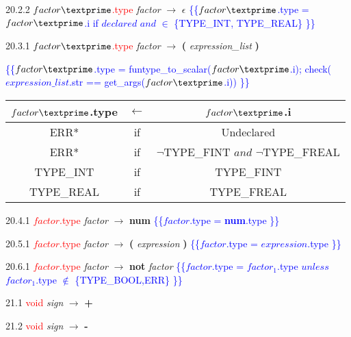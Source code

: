 20.2.2 \textcolor{red}{$factor\textprime$.type} \emph{factor\textprime} $\rightarrow$ $\epsilon$ \textcolor{blue}{\{\{$factor\textprime$.type = $factor\textprime$.i if $declared$ $and$ $\in$ \{TYPE_INT, TYPE_REAL\} \}\}}

20.3.1 \textcolor{red}{$factor\textprime$.type} \emph{factor\textprime} $\rightarrow$ \textbf{(} \emph{expression\_list} \textbf{)}

\textcolor{blue}{\{\{$factor\textprime$.type = funtype_to_scalar($factor\textprime$.i); check($expression\_list$.str == get_args($factor\textprime$.i)) \}\}}

\begin{tabular}[t]{|c|c|c|}
  \hline

  $factor\textprime$.type & \textbf{$\leftarrow$} & $factor\textprime$.i \\

  \hline
  ERR* & if & Undeclared \\
  ERR* & if & $\neg$TYPE_FINT $and$ $\neg$TYPE_FREAL \\
  TYPE_INT & if & TYPE_FINT \\
  TYPE_REAL & if & TYPE_FREAL \\

  \hline

\end{tabular}

20.4.1 \textcolor{red}{$factor$.type} \emph{factor} $\rightarrow$ \textbf{num} \textcolor{blue}{\{\{$factor$.type = \textbf{num}.type \}\}}

20.5.1 \textcolor{red}{$factor$.type} \emph{factor} $\rightarrow$ \textbf{(} \emph{expression} \textbf{)} \textcolor{blue}{\{\{$factor$.type = $expression$.type \}\}}

20.6.1 \textcolor{red}{$factor$.type} \emph{factor} $\rightarrow$ \textbf{not} \emph{factor} \textcolor{blue}{\{\{$factor$.type = $factor_1$.type $unless$ $factor_1$.type $\notin$ \{TYPE_BOOL,ERR\} \}\}}

21.1 \textcolor{red}{void} \emph{sign} $\rightarrow$ \textbf{+}

21.2 \textcolor{red}{void} \emph{sign} $\rightarrow$ \textbf{-}
